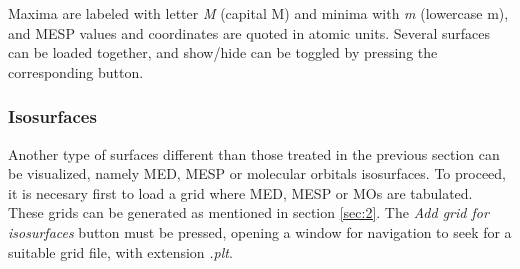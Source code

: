 \documentclass[10pt]{article}
\begin{document}
Maxima are labeled with letter {\it M} (capital M) and minima with {\it m} (lowercase m),
and MESP values and coordinates are quoted in atomic units.
Several surfaces can be loaded together, and show/hide can be toggled by pressing the
corresponding button.

\subsubsection{Isosurfaces \label{sec:4.13.10}}

Another type of surfaces different than those treated in the previous section can be visualized,
namely MED, MESP 
or molecular orbitals isosurfaces. 
To proceed, it is necesary first to load a grid
where MED, MESP or MOs are tabulated. These grids can be generated as mentioned in section \ref{sec:2}. The
{\it Add grid for isosurfaces} button must be pressed, opening a window for 
navigation to seek for a suitable grid file, with extension {\it .plt}.
\end{document}
